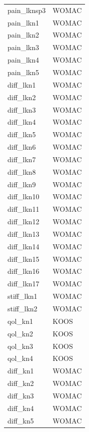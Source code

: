 \begin{tabular}{ll}
pain_lknsp3 & WOMAC \\
pain_lkn1 & WOMAC \\
pain_lkn2 & WOMAC \\
pain_lkn3 & WOMAC \\
pain_lkn4 & WOMAC \\
pain_lkn5 & WOMAC \\
diff_lkn1 & WOMAC \\
diff_lkn2 & WOMAC \\
diff_lkn3 & WOMAC \\
diff_lkn4 & WOMAC \\
diff_lkn5 & WOMAC \\
diff_lkn6 & WOMAC \\
diff_lkn7 & WOMAC \\
diff_lkn8 & WOMAC \\
diff_lkn9 & WOMAC \\
diff_lkn10 & WOMAC \\
diff_lkn11 & WOMAC \\
diff_lkn12 & WOMAC \\
diff_lkn13 & WOMAC \\
diff_lkn14 & WOMAC \\
diff_lkn15 & WOMAC \\
diff_lkn16 & WOMAC \\
diff_lkn17 & WOMAC \\
stiff_lkn1 & WOMAC \\
stiff_lkn2 & WOMAC \\
qol_kn1 & KOOS \\
qol_kn2 & KOOS \\
qol_kn3 & KOOS \\
qol_kn4 & KOOS \\
diff_kn1 & WOMAC \\
diff_kn2 & WOMAC \\
diff_kn3 & WOMAC \\
diff_kn4 & WOMAC \\
diff_kn5 & WOMAC \\
\bottomrule\end{tabular}
